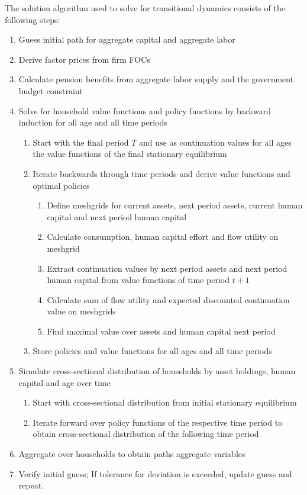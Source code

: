 The solution algorithm used to solve for transitional dynamics consists of the following steps:
\begin{enumerate}
    \item Guess initial path for aggregate capital and aggregate labor
    \item Derive factor prices from firm FOCs
    \item Calculate pension benefits from aggregate labor supply and the government budget constraint
    \item Solve for household value functions and policy functions by backward induction for all age and all time periods
        \begin{enumerate}
            \item Start with the final period $T$ and use as continuation values for all ages the value functions of the final stationary equilibrium
            \item Iterate backwards through time periods and derive value functions and optimal policies
                \begin{enumerate}
                    \item Define meshgrids for current assets, next period assets, current human capital and next period human capital
                    \item Calculate consumption, human capital effort and flow utility on meshgrid
                    \item Extract continuation values by next period assets and next period human capital from value functions of time period $t+1$
                    \item Calculate sum of flow utility and expected discounted continuation value on meshgrids
                    \item Find maximal value over assets and human capital next period
                \end{enumerate}
            \item Store policies and value functions for all ages and all time periods
        \end{enumerate}
    \item Simulate cross-sectional distribution of households by asset holdings, human capital and age over time
        \begin{enumerate}
            \item Start with cross-sectional distribution from initial stationary equilibrium
            \item Iterate forward over policy functions of the respective time period to obtain cross-sectional distribution of the following time period
        \end{enumerate}
    \item Aggregate over households to obtain paths aggregate variables
    \item Verify initial guess; If tolerance for deviation is exceeded, update guess and repeat.
\end{enumerate}

